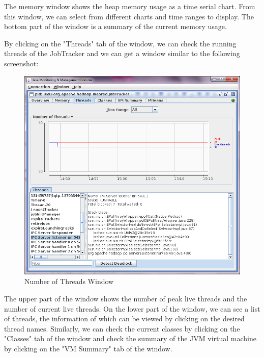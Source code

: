 The memory window shows the heap memory usage as a time serial chart. From this window, we can select from different charts and time ranges to display. The bottom part of the window is a summary of the current memory usage.

By clicking on the "Threads" tab of the window, we can check the running threads of the JobTracker and we can get a window similar to the following screenshot:
\begin{figure}[h]
  \centering
  \includegraphics[width=.8\textwidth]{figs/5163os_06_04.png}
  \caption{Number of Threads Window}\label{fig:num.threads}
\end{figure} 

The upper part of the window shows the number of peak live threads and the number of current live threads. On the lower part of the window, we can see a list of threads, the information of which can be viewed by clicking on the desired thread names.
Similarly, we can check the current classes by clicking on the "Classes" tab of the window and check the summary of the JVM virtual machine by clicking on the "VM Summary" tab of the window.

